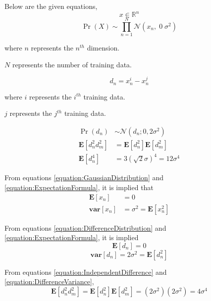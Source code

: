 \documentclass[a4paper,12pt]{article}
\begin{document}
Below are the given equations,
\begin{equation}
x \in \mathbb{R}^{n}
\end{equation} 
\begin{equation}
\label{equation:GaussianDistribution}
\Pr(X) \sim \prod_{n=1}^{N} \mathcal{N}(x_{n},\; 0 \; \sigma^{2})
\end{equation} 
{\centering where $n$ represents the $n^{th}$ dimension. 

$N$ represents the number of training data. \par}
\begin{equation}
\label{equation:DifferenceGaussian}
d_{n} = x_{n}^{i} - x_{n}^{j}
\end{equation} 

{\centering where $i$ represents the $i^{th}$ training data. 

$j$ represents the $j^{th}$ training data. \par}

\begin{align}
\label{equation:DifferenceDistribution}
\Pr(d_{n}) &\sim \mathcal{N}(d_{n} ; 0 , 2\sigma^{2}) \\
\label{equation:IndependentDifference}
\mathbf{E}[d_{n}^{2}d_{m}^{2}] &= \mathbf{E}[d_{n}^{2}]\mathbf{E}[d_{m}^{2}] \\
\label{equation:FourthMoment}
\mathbf{E}[d_{n}^{4}] &= 3(\sqrt{2}\sigma)^{4} = 12\sigma^{4}
\end{align} 

From equations \ref{equation:GaussianDistribution} and \ref{equation:ExpectationFormula}, it is implied that
\begin{align}
\mathbf{E}[x_{n}] &= 0 \\
\mathbf{var}[x_{n}] &= \sigma^{2} = \mathbf{E}[x_{n}^{2}]
\end{align} 

From equations \ref{equation:DifferenceDistribution} and \ref{equation:ExpectationFormula}, it is implied
\begin{equation}
\mathbf{E}[d_{n}] = 0
\end{equation} 
\begin{equation}
\label{equation:DifferenceVariance}
\mathbf{var}[d_{n}] = 2\sigma^{2} = \mathbf{E}[d_{n}^{2}]
\end{equation} 

From equations \ref{equation:IndependentDifference} and \ref{equation:DifferenceVariance}, 
\begin{equation}
\mathbf{E}[d_{n}^{2}d_{m}^{2}] = \mathbf{E}[d_{n}^{2}]\mathbf{E}[d_{m}^{2}] = (2\sigma^{2})(2\sigma^{2}) = 4\sigma^{4}
\end{equation} 
\end{document}
